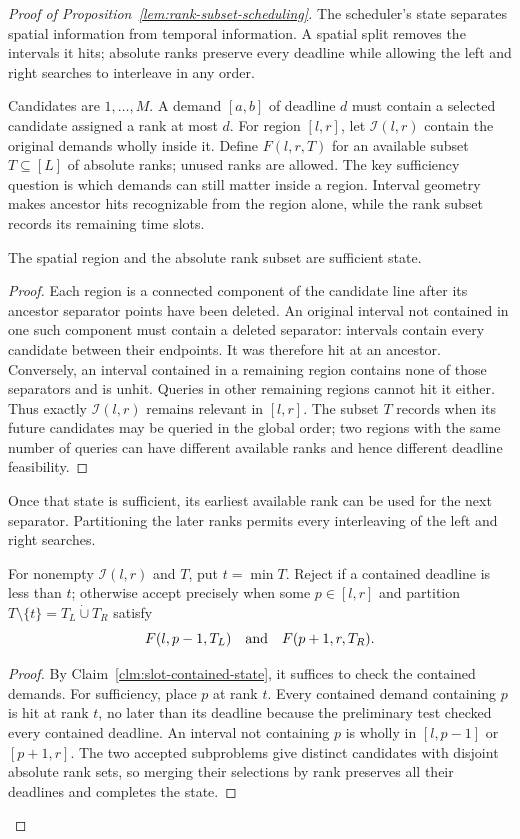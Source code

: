\begin{proof}[Proof of Proposition~\ref{lem:rank-subset-scheduling}]
The scheduler's state separates spatial information from temporal
information. A spatial split removes the intervals it hits; absolute
ranks preserve every deadline while allowing the left and right
searches to interleave in any order.


Candidates are $1,\ldots,M$. A demand $[a,b]$ of deadline $d$
must contain a selected candidate assigned a rank at most $d$.
For region $[l,r]$, let $\mathcal I(l,r)$ contain the original
demands wholly inside it. Define $F(l,r,T)$ for an available subset
$T\subseteq[L]$ of absolute ranks; unused ranks are allowed.
The key sufficiency question is which demands can still matter inside
a region. Interval geometry makes ancestor hits recognizable from the
region alone, while the rank subset records its remaining time slots.

\begin{claim}
\label{clm:slot-contained-state}
The spatial region and the absolute rank subset are sufficient state.
\end{claim}
\begin{proof}
Each region is a connected component of the candidate line after
its ancestor separator points have been deleted. An original interval
not contained in one such component must contain a deleted separator:
intervals contain every candidate between their endpoints. It was
therefore hit at an ancestor. Conversely, an interval contained in a
remaining region contains none of those separators and is unhit.
Queries in other remaining regions cannot hit it either. Thus exactly
$\mathcal I(l,r)$ remains relevant in $[l,r]$. The subset $T$ records
when its future candidates may be queried in the global order; two
regions with the same number of queries can have different available
ranks and hence different deadline feasibility.
\end{proof}
Once that state is sufficient, its earliest available rank can be used
for the next separator. Partitioning the later ranks permits every
interleaving of the left and right searches.

\begin{claim}
\label{clm:slot-earliest-rank}
For nonempty $\mathcal I(l,r)$ and $T$, put $t=\min T$.
Reject if a contained deadline is less than $t$; otherwise accept
precisely when some $p\in[l,r]$ and partition
$T\setminus\{t\}=T_L\mathbin{\dot\cup}T_R$ satisfy
\[
 F(l,p-1,T_L)\quad\hbox{and}\quad F(p+1,r,T_R).
\]
\end{claim}
\begin{proof}
By Claim~\ref{clm:slot-contained-state}, it suffices to check the
contained demands. For sufficiency, place $p$ at rank $t$. Every contained demand
containing $p$ is hit at rank $t$, no later than its deadline because
the preliminary test checked every contained deadline. An interval
not containing $p$ is wholly in $[l,p-1]$ or $[p+1,r]$.
The two accepted subproblems give distinct candidates with disjoint
absolute rank sets, so merging their selections by rank preserves
all their deadlines and completes the state.


\end{proof}
\end{proof}

